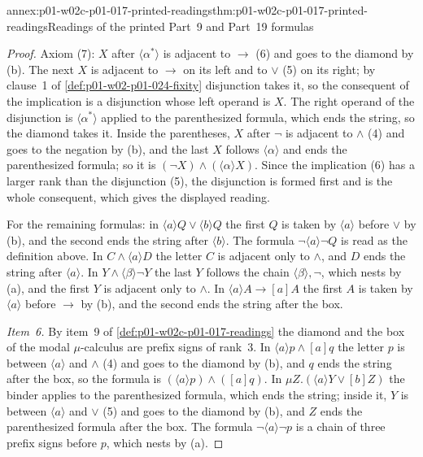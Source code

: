 \begin{annexitem}{annex:p01-w02c-p01-017-printed-readings}{thm:p01-w02c-p01-017-printed-readings}{Readings of the printed Part~9 and Part~19 formulas}
\begin{proof}
Axiom (7): \(X\) after \(\langle\alpha^{*}\rangle\) is adjacent to
\(\to\) (6) and goes to the diamond by (b).  The next \(X\) is adjacent
to \(\to\) on its left and to \(\lor\) (5) on its right; by clause~1 of
\cref{def:p01-w02-p01-024-fixity} disjunction takes it, so the
consequent of the implication is a disjunction whose left operand is
\(X\).  The right operand of the disjunction is
\(\langle\alpha^{*}\rangle\) applied to the parenthesized formula, which
ends the string, so the diamond takes it.  Inside the parentheses,
\(X\) after \(\neg\) is adjacent to \(\land\) (4) and goes to the
negation by (b), and the last \(X\) follows \(\langle\alpha\rangle\) and
ends the parenthesized formula; so it is \((\neg X)\land(\langle\alpha\rangle X)\).
Since the implication (6) has a larger rank than the disjunction (5),
the disjunction is formed first and is the whole consequent, which gives
the displayed reading.

For the remaining formulas: in \(\langle a\rangle Q\lor\langle b\rangle Q\)
the first \(Q\) is taken by \(\langle a\rangle\) before \(\lor\) by (b),
and the second ends the string after \(\langle b\rangle\).  The formula
\(\neg\langle a\rangle\neg Q\) is read as the definition above.  In
\(C\land\langle a\rangle D\) the letter \(C\) is adjacent only to
\(\land\), and \(D\) ends the string after \(\langle a\rangle\).  In
\(Y\land\langle\beta\rangle\neg Y\) the last \(Y\) follows the chain
\(\langle\beta\rangle,\neg\), which nests by (a), and the first \(Y\) is
adjacent only to \(\land\).  In \(\langle a\rangle A\to[a]A\) the first
\(A\) is taken by \(\langle a\rangle\) before \(\to\) by (b), and the
second ends the string after the box.

\emph{Item~6.}  By item~9 of \cref{def:p01-w02c-p01-017-readings} the
diamond and the box of the modal \(\mu\)-calculus are prefix signs of
rank~3.  In \(\langle a\rangle p\land[a]q\) the letter \(p\) is between
\(\langle a\rangle\) and \(\land\) (4) and goes to the diamond by (b),
and \(q\) ends the string after the box, so the formula is
\((\langle a\rangle p)\land([a]q)\).  In
\(\mu Z.(\langle a\rangle Y\lor[b]Z)\) the binder applies to the
parenthesized formula, which ends the string; inside it, \(Y\) is
between \(\langle a\rangle\) and \(\lor\) (5) and goes to the diamond by
(b), and \(Z\) ends the parenthesized formula after the box.  The formula
\(\neg\langle a\rangle\neg p\) is a chain of three prefix signs before
\(p\), which nests by (a).
\end{proof}
\end{annexitem}

